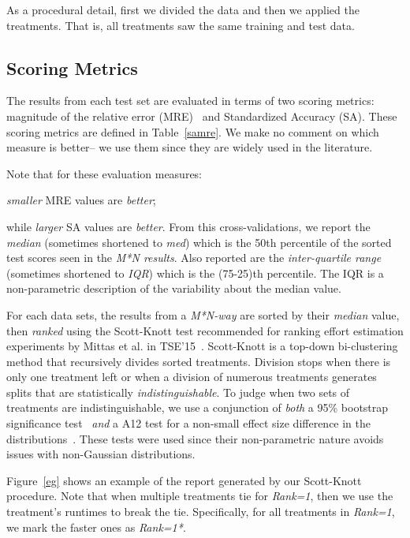 As a procedural detail, first we divided the data and then we applied the treatments. That is, all treatments saw the same training and test data.



\subsection{Scoring Metrics}

The results from each test set are evaluated in terms of two scoring metrics:  magnitude of the relative error (MRE)~\cite{Conte:1986:SEM:6176} and Standardized Accuracy (SA). These scoring metrics  are defined in Table~\ref{samre}.
We make no comment
on which   measure is better-- we use them since   they are widely used in the literature.

Note that for these evaluation measures:
\bi
\item {\em smaller} MRE values are {\em better};
\item
while {\em larger} SA values are {\em better}.
\ei
From this cross-validations,
we  report the {\em median} (sometimes shortened to {\em med})
which is the 50th percentile of the sorted test scores seen in the {\em M*N results}.
Also reported are the  {\em inter-quartile range} (sometimes shortened to {\em IQR}) which is the (75-25)th percentile.
The IQR is a  non-parametric
description of the   variability about the median value.  

For each data sets, the results from a {\em M*N-way} are sorted by their {\em  median} value, then {\em ranked} using the Scott-Knott test
recommended for ranking effort estimation experiments by Mittas et al. in TSE'15~\cite{Mittas13}. Scott-Knott is a top-down bi-clustering
method that recursively divides sorted treatments. Division stops when there is only one treatment left or when a division of numerous treatments generates 
splits that are statistically {\em indistinguishable}. 
To judge when two sets of treatments are indistinguishable, we use a conjunction of {\em both}  a 95\% bootstrap significance test~\cite{efron93} {\em and}
a A12 test for a non-small effect size difference in the distributions~\cite{MenziesNeg:2017}. These tests were used since their non-parametric nature avoids issues with non-Gaussian
distributions.  

Figure~\ref{eg} shows an example of the report generated by our Scott-Knott procedure.
Note that when multiple treatments tie for {\em Rank=1}, then we use the treatment's
runtimes to break the tie. Specifically, for all treatments in {\em Rank=1}, we mark the faster ones as \colorbox{gray!20}{{\em Rank=1*}}.

